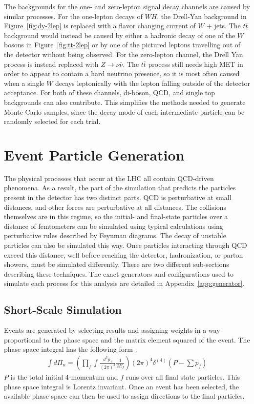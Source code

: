 The backgrounds for the one- and zero-lepton signal decay channels are
caused by similar processes.
For the one-lepton decays of $WH$, the Drell-Yan background in Figure~\ref{fig:dy-2lep}
is replaced with a flavor changing current of $W$ + jets.
The $t\bar{t}$ background would instead be caused by either a hadronic decay of
one of the $W$ bosons in Figure~\ref{fig:tt-2lep}
or by one of the pictured leptons travelling out of the detector without being observed.
For the zero-lepton channel, the Drell Yan process is instead replaced with
$Z \rightarrow \nu\bar{\nu}$.
The $t\bar{t}$ process still needs high MET in order to appear to
contain a hard neutrino presence,
so it is most often caused when a single $W$ decays leptonically with the lepton
falling outside of the detector acceptance.
For both of these channels, di-boson, QCD, and single top backgrounds can also contribute.
This simplifies the methods needed to generate Monte Carlo samples,
since the decay mode of each intermediate particle can be randomly selected for each trial.

\section{Event Particle Generation}

The physical processes that occur at the LHC all contain QCD-driven phenomena.
As a result, the part of the simulation that predicts the particles present in the detector
has two distinct parts.
QCD is perturbative at small distances,
and other forces are perturbative at all distances.
The collisions themselves are in this regime,
so the initial- and final-state particles over a distance of femtometers
can be simulated using typical calculations using
perturbative rules described by Feynman diagrams.
The decay of unstable particles can also be simulated this way.
Once particles interacting through QCD exceed this distance,
well before reaching the detector,
hadronization, or parton showers, must be simulated differently.
There are two different sub-sections describing these techniques.
The exact generators and configurations used to simulate each process for this analysis
are detailed in Appendix~\ref{app:generator}.

\subsection{Short-Scale Simulation}

Events are generated by selecting results and assigning weights in a way proportional
to the phase space and the matrix element squared of the event.
The phase space integral has the following form \cite{Peskin:257493}.
\begin{gather}
  \int d\Pi_n = \left( \prod_f \int \frac{d^3p_f}{(2\pi)^3} \frac{1}{2E_f} \right)
                (2\pi)^4 \delta^{(4)}(P - \sum p_f)
\end{gather}
$P$ is the total initial 4-momentum and $f$ runs over all final state particles.
This phase space integral is Lorentz invariant.
Once an event has been selected, the available phase space can then be used to assign
directions to the final particles.

